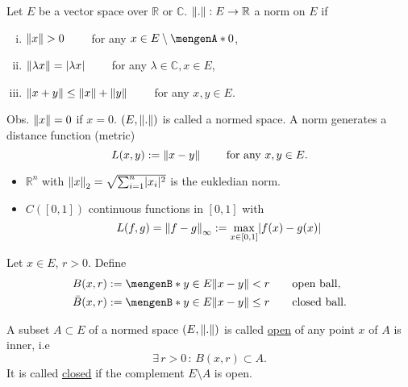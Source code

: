 
\begin{definition*}
	Let $E$ be a vector space over $\mathbb{R}$ or $\mathbb{C}$. $\norm{.}:E \to \mathbb{R}$ a norm on $E$ if
	\begin{enumerate}[(i)]
		\item $\norm{x} >0 \qquad $ for any $x \in E \setminus \set{0}$,
		\item $\norm{\lambda x} = \abs{\lambda x} \qquad $ for any $\lambda \in \mathbb{C},x \in E$,
		\item $\norm{x+y} \leq \norm{x} + \norm{y} \qquad$ for any $x,y \in E$.
	\end{enumerate}
	Obs. $\norm{x}=0$ if $x =0$. $(E, \norm{.})$ is called a normed space. A norm generates a distance function (metric)
	\[
		L(x,y):= \norm{x-y} \qquad \text{ for any }x,y \in E.
	\]
\end{definition*}
\begin{beispiele}
	\begin{itemize}
		\item $\mathbb{R}^n$ with $\norm{x}_2 = \sqrt{\sum^{n}_{i=1}\abs{x_i}^2}$ is the eukledian norm.
		\item $C([0,1])$ continuous functions in $[0,1]$ with
		\[
			L(f,g)=\norm{f-g}_{\infty}:= \max_{x \in [0,1]}\abs{f(x)-g(x)}
		\]
	\end{itemize}
\end{beispiele}
\begin{definition*}[balls]
	 Let $x \in E$, $r >0$. Define
	\begin{align*}
		B(x,r) &:= \set[y \in E]{\norm{x-y}<r} \qquad \text{open ball}, \\
		\bar{B}(x,r) &:= \set[y \in E]{\norm{x-y}\leq r} \qquad \text{closed ball}.
	\end{align*}
\end{definition*}
\begin{definition*}
	A subset $A \subset E$ of a normed space $(E,\norm{.})$ is called \underline{open} of any point $x$ of $A$ is inner, i.e 
	\[
		\exists\,r>0 \,:\, B(x,r) \subset A.
	\]
	It is called \underline{closed} if the complement $E \setminus A$ is open.
\end{definition*}
